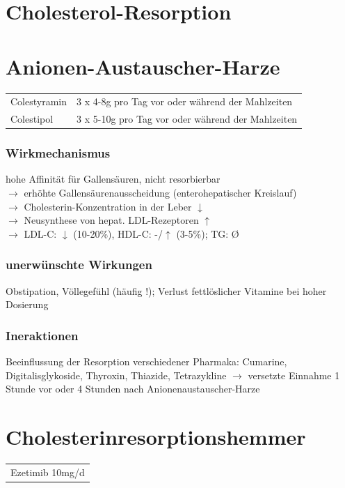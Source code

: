 \documentclass[10pt,a4paper]{report}
\begin{document}
\section{Cholesterol-Resorption} %
\label{sec:cholesterol_resorption}

\section{Anionen-Austauscher-Harze} %
\label{sec:anionen_austauscher_harze}
\begin{tabularx}{\textwidth}{XX}
Colestyramin&3 x 4-8g pro Tag vor oder während der Mahlzeiten\\
Colestipol&3 x 5-10g pro Tag vor oder während der Mahlzeiten\\
\end{tabularx}
\subsubsection{Wirkmechanismus} %
\label{par:wirkmechanismus}
hohe Affinität für Gallensäuren, nicht resorbierbar\\
$\rightarrow$ erhöhte Gallensäurenausscheidung (enterohepatischer Kreislauf)\\
$\rightarrow$ Cholesterin-Konzentration in der Leber $\downarrow$ \\
$\rightarrow$ Neusynthese von hepat. LDL-Rezeptoren $\uparrow$ \\
$\rightarrow$ LDL-C: $\downarrow$ (10-20\%), HDL-C: -/$\uparrow$ (3-5\%); TG: Ø\\
\subsubsection{unerwünschte Wirkungen} %
\label{par:unerw_nschte_wirkungen}
Obstipation, Völlegefühl (häufig !); Verlust fettlöslicher Vitamine bei hoher Dosierung
\subsubsection{Ineraktionen} %
\label{par:ineraktionen}
Beeinflussung der Resorption verschiedener Pharmaka:
Cumarine, Digitalisglykoside, Thyroxin, Thiazide, Tetrazykline
$\rightarrow$ versetzte Einnahme 1 Stunde vor oder 4 Stunden nach Anionenaustauscher-Harze
\section{Cholesterinresorptionshemmer} %
\label{sec:cholesterinresorptionshemmer}
\begin{tabularx}{\textwidth}{X}
Ezetimib 10mg/d
\end{tabularx}
\end{document}
